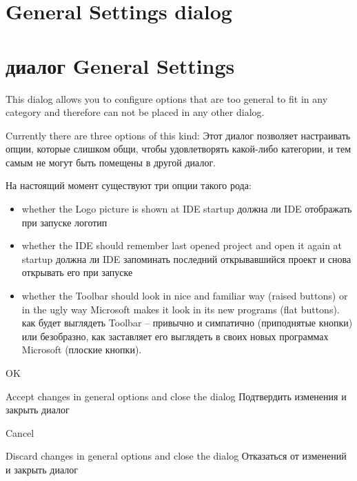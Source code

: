 \ifenglish
\section {General Settings dialog}
\else
\section {диалог General Settings}
\fi
{}
\nominitoc

\ifenglish
This dialog allows you to configure options that are too general to
fit in any category and therefore can not be placed in any other
dialog.

Currently there are three options of this kind:
\else
Этот диалог позволяет настраивать опции, которые слишком общи, чтобы 
удовлетворять какой-либо категории, и тем самым не могут быть помещены в
другой диалог.

На настоящий момент существуют три опции такого рода:
\fi
\begin{itemize}

\item 
 \ifenglish
 whether the Logo picture is shown at IDE startup
 \else
 должна ли IDE отображать при запуске логотип
 \fi
\item 
 \ifenglish
 whether the IDE should remember last opened project and open it
again at startup
 \else
  должна ли IDE запоминать последний открывавшийся проект и снова открывать 
 его при запуске
 \fi
\item 
 \ifenglish
 whether the Toolbar should look in nice and familiar way (raised buttons)
or in the ugly way Microsoft makes it look in its new programs (flat buttons).
 \else
 как будет выглядеть Toolbar -- привычно и симпатично (приподнятые кнопки) 
 или безобразно, как заставляет его выглядеть в своих новых программах 
 Microsoft (плоские кнопки).
 \fi
\end{itemize}


\begin{popup}
\caption{OK}
\ifenglish
Accept changes in general options and close the dialog
 \else
Подтвердить изменения и закрыть диалог
 \fi
\end{popup}

\begin{popup}
\caption{Cancel}
\ifenglish
Discard changes in general options and close the dialog
\else
Отказаться от изменений и закрыть диалог 
\fi
\end{popup}

